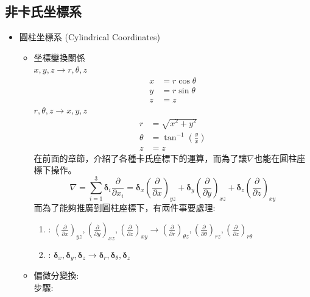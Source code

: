 \documentclass[../main.tex]{subfiles}
\begin{document}
\subsection{非卡氏坐標系}
\begin{itemize}
  \item 圓柱坐標系 (Cylindrical Coordinates)
  \begin{itemize}
    \item 坐標變換關係\\
      $x,y,z \rightarrow r,\theta,z$
      \begin{align}
        x &= r \cos\theta\\
        y &= r \sin\theta\\
        z &= z
      \end{align}
      $r,\theta,z \rightarrow x,y,z$
      \begin{align}
        r &= \sqrt{x^2 + y^2} \label{eq:cylindrical_r_to_cat}\\
        \theta &= \tan^{-1}\left(\frac{y}{x}\right) \label{eq:cylindrical_theta_to_cat}\\
        z &= z 
      \end{align}
    在前面的章節，介紹了各種卡氏座標下的運算，而為了讓$\nabla$也能在圓柱座標下操作。
    \begin{equation}
      \nabla = \sum_{i=1}^3 \bm\delta_i \frac{\partial }{\partial x_i} =
      \bm\delta_x \left(\frac{\partial }{\partial x}\right)_{yz} +
      \bm\delta_y \left(\frac{\partial }{\partial y}\right)_{xz} +
      \bm\delta_z \left(\frac{\partial }{\partial z}\right)_{xy}
    \end{equation}
    而為了能夠推廣到圓柱座標下，有兩件事要處理:
    \begin{enumerate}
      \item {}: $\left(\frac{\partial }{\partial x}\right)_{yz},
        \left(\frac{\partial }{\partial y}\right)_{xz},
        \left(\frac{\partial }{\partial z}\right)_{xy} \to
        \left(\frac{\partial }{\partial r}\right)_{\theta z},
        \left(\frac{\partial }{\partial \theta}\right)_{rz},
        \left(\frac{\partial }{\partial z}\right)_{r\theta}$
      \item {}: $\bm\delta_x,\bm\delta_y,\bm\delta_z \to \bm\delta_r,\bm\delta_\theta,\bm\delta_z$
    \end{enumerate}
    \item 偏微分變換:\\
      步驟:
      \begin{enumerate}

\end{enumerate}
\end{itemize}
\end{itemize}
\end{document}
